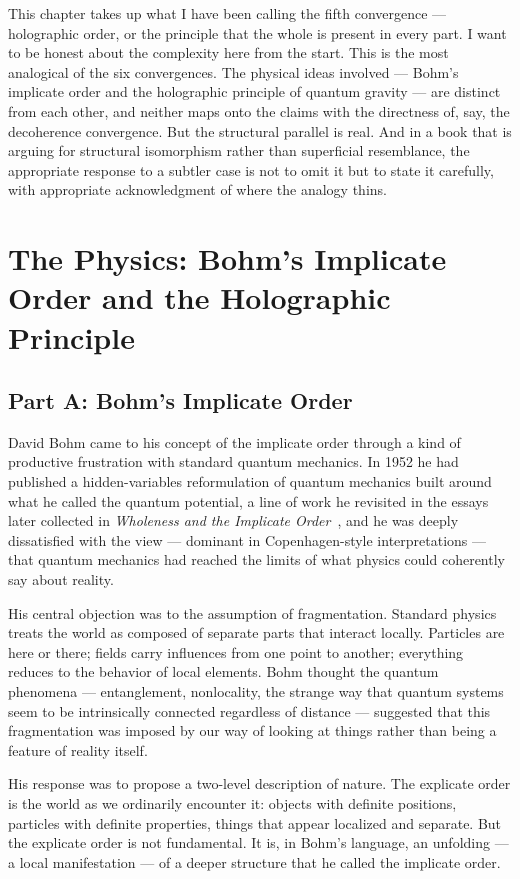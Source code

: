 This chapter takes up what I have been calling the fifth convergence --- holographic order, or the principle that the whole is present in every part.
I want to be honest about the complexity here from the start.
This is the most analogical of the six convergences.
The physical ideas involved --- Bohm's implicate order and the holographic principle of quantum gravity --- are distinct from each other, and neither maps onto the \bahai claims with the directness of, say, the decoherence convergence.
But the structural parallel is real.
And in a book that is arguing for structural isomorphism rather than superficial resemblance, the appropriate response to a subtler case is not to omit it but to state it carefully, with appropriate acknowledgment of where the analogy thins.

\section{The Physics: Bohm's Implicate Order and the Holographic Principle}
\label{sec:ch11-physics}

\subsection*{Part A: Bohm's Implicate Order}

David Bohm came to his concept of the implicate order through a kind of productive frustration with standard quantum mechanics.
In 1952 he had published a hidden-variables reformulation of quantum mechanics built around what he called the quantum potential, a line of work he revisited in the essays later collected in \emph{Wholeness and the Implicate Order}~\citep{Bohm1980}, and he was deeply dissatisfied with the view --- dominant in Copenhagen-style interpretations --- that quantum mechanics had reached the limits of what physics could coherently say about reality.

His central objection was to the assumption of fragmentation.
Standard physics treats the world as composed of separate parts that interact locally.
Particles are here or there; fields carry influences from one point to another; everything reduces to the behavior of local elements.
Bohm thought the quantum phenomena --- entanglement, nonlocality, the strange way that quantum systems seem to be intrinsically connected regardless of distance --- suggested that this fragmentation was imposed by our way of looking at things rather than being a feature of reality itself.

His response was to propose a two-level description of nature.
The explicate order is the world as we ordinarily encounter it: objects with definite positions, particles with definite properties, things that appear localized and separate.
But the explicate order is not fundamental.
It is, in Bohm's language, an unfolding --- a local manifestation --- of a deeper structure that he called the implicate order.

